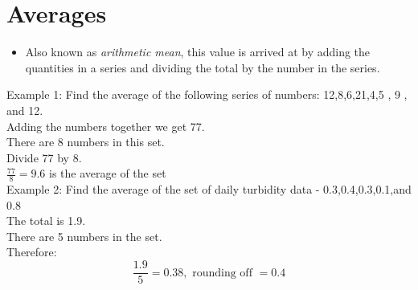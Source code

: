 \section{Averages}
\begin{itemize}
\item Also known as \emph{arithmetic mean}, this value is arrived at by adding the quantities in a series and dividing the total by the number in the series.
\end{itemize}
Example 1: Find the average of the following series of numbers: 12,8,6,21,4,5 , 9 , and 12.\\
Adding the numbers together we get 77.\\
There are 8 numbers in this set.\\
Divide 77 by 8.\\

$\frac{77}{8}=9.6$ is the average of the set\\

Example 2:  Find the average of the set of daily turbidity data - 0.3,0.4,0.3,0.1,and 0.8\\
The total is 1.9.\\
There are 5 numbers in the set.\\
Therefore:
$$
\frac{1.9}{5}=0.38, \text { rounding off }=0.4
$$

